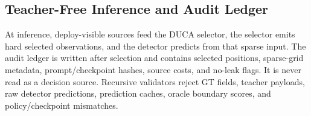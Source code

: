 \subsection{Teacher-Free Inference and Audit Ledger}

At inference, deploy-visible sources feed the DUCA selector, the selector emits
hard selected observations, and the detector predicts from that sparse input.
The audit ledger is written after selection and contains selected positions,
sparse-grid metadata, prompt/checkpoint hashes, source costs, and no-leak flags.
It is never read as a decision source. Recursive validators reject GT fields,
teacher payloads, raw detector predictions, prediction caches, oracle boundary
scores, and policy/checkpoint mismatches.
